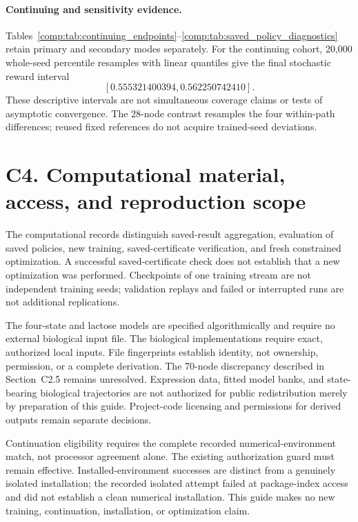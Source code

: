 \documentclass[11pt]{article}
\newcommand{\1}{\mathbf{1}}
\begin{document}
\paragraph{Continuing and sensitivity evidence.}
Tables~\ref{comp:tab:continuing_endpoints}--\ref{comp:tab:saved_policy_diagnostics} retain primary and secondary modes separately. For the continuing cohort, 20,000 whole-seed percentile resamples with linear quantiles give the final stochastic reward interval
\[
 [0.555321400394,0.562250742410].
\] These descriptive intervals are not simultaneous coverage claims or tests of asymptotic convergence. The 28-node contrast resamples the four within-path differences; reused fixed references do not acquire trained-seed deviations.





\renewcommand{\arraystretch}{1.05}

\section*{C4. Computational material, access, and reproduction scope}
\label{comp:sec:access}
The computational records distinguish saved-result aggregation, evaluation of saved policies, new training, saved-certificate verification, and fresh constrained optimization. A successful saved-certificate check does not establish that a new optimization was performed. Checkpoints of one training stream are not independent training seeds; validation replays and failed or interrupted runs are not additional replications.

The four-state and lactose models are specified algorithmically and require no external biological input file. The biological implementations require exact, authorized local inputs. File fingerprints establish identity, not ownership, permission, or a complete derivation. The 70-node discrepancy described in Section~C2.5 remains unresolved. Expression data, fitted model banks, and state-bearing biological trajectories are not authorized for public redistribution merely by preparation of this guide. Project-code licensing and permissions for derived outputs remain separate decisions.

Continuation eligibility requires the complete recorded numerical-environment match, not processor agreement alone. The existing authorization guard must remain effective. Installed-environment successes are distinct from a genuinely isolated installation; the recorded isolated attempt failed at package-index access and did not establish a clean numerical installation. This guide makes no new training, continuation, installation, or optimization claim.
\end{document}
